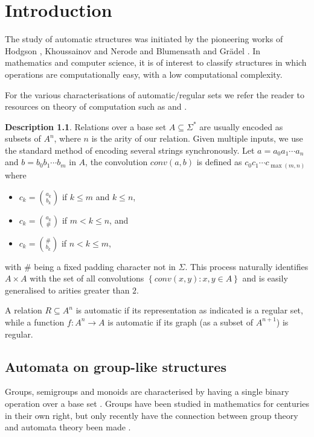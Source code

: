\documentclass[british,a4paper,11pt,abstract=on]{scrreprt}
\theoremstyle{definition}
\newtheorem{descr}[theorem]{Description}
\theoremstyle{remark}
\newcommand{\set}[1]{\left\{ #1 \right\}}
\begin{document}
\tableofcontents

\chapter{Introduction}

The study of automatic structures was initiated by the pioneering works of
Hodgson \autocite{Ho76, Ho83}, Khoussainov and Nerode \autocite{KN} and Blumensath and Grädel \autocite{BG00}.
In mathematics and computer science, it is of interest to classify structures in which operations are computationally easy, with a low computational complexity.

For the various characterisations of automatic/regular sets we refer the reader to resources on theory of computation such as
\autocite{Hopcroft} and \autocite{fullautomatatheory}.

\begin{descr}
    Relations over a base set \(A\subseteq \Sigma^*\) are usually encoded as subsets of \(A^n\),
    where \(n\) is the arity of our relation. Given multiple inputs, we use the standard method of encoding several strings synchronously.
    Let \(a = a_0a_1\cdots a_n\) and \(b = b_0b_1\cdots b_m\) in \(A\), the convolution \(conv(a,b)\) is defined as
    \(c_0c_1\cdots c_{\max(m,n)}\) where
    \begin{itemize}
        \item \(c_k = \binom{a_k}{b_k}\) if \(k\leq m\) and \(k \leq n\),
        \item \(c_k = \binom{a_k}{\#}\) if \(m < k \leq n\), and
        \item \(c_k = \binom{\#}{b_k}\) if \(n < k \leq m\),
    \end{itemize}
    with \(\#\) being a fixed padding character not in \(\Sigma\).
    This process naturally identifies \(A\times A\) with the set of all convolutions \(\set{conv(x,y):x,y\in A}\) and is
    easily generalised to arities greater than \(2\).
\end{descr}
A relation \(R\subseteq A^n\) is automatic if its representation as indicated is a regular set,
while a function \(f: A^n\to A\) is automatic if its graph (as a subset of \(A^{n+1}\)) is regular.

\section{Automata on group-like structures}

Groups, semigroups and monoids are characterised by having a single binary operation over a base set \autocite{algebre}.
Groups have been studied in mathematics for centuries in their own right, but only recently have the connection between group theory and automata theory been made
\autocite{Ho76,Ho83,KN,Epstein}.
\end{document}
